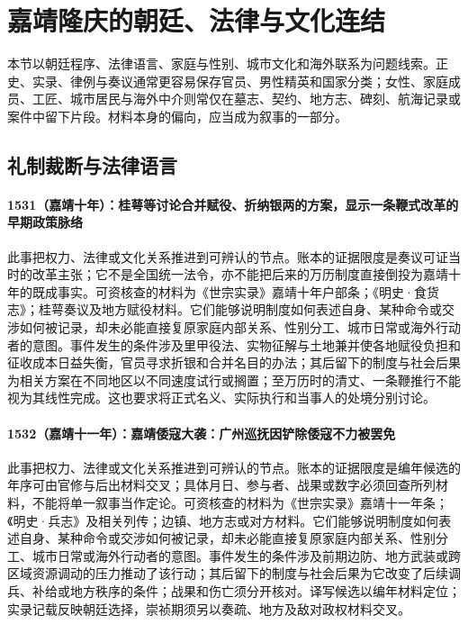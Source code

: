 \section{嘉靖隆庆的朝廷、法律与文化连结}

本节以朝廷程序、法律语言、家庭与性别、城市文化和海外联系为问题线索。正史、实录、律例与奏议通常更容易保存官员、男性精英和国家分类；女性、家庭成员、工匠、城市居民与海外中介则常仅在墓志、契约、地方志、碑刻、航海记录或案件中留下片段。材料本身的偏向，应当成为叙事的一部分。

\subsection{礼制裁断与法律语言}

\paragraph{1531（嘉靖十年）：桂萼等讨论合并赋役、折纳银两的方案，显示一条鞭式改革的早期政策脉络} 此事把权力、法律或文化关系推进到可辨认的节点。账本的证据限度是奏议可证当时的改革主张；它不是全国统一法令，亦不能把后来的万历制度直接倒投为嘉靖十年的既成事实。可资核查的材料为《世宗实录》嘉靖十年户部条；《明史·食货志》；桂萼奏议及地方赋役材料。它们能够说明制度如何表述自身、某种命令或交涉如何被记录，却未必能直接复原家庭内部关系、性别分工、城市日常或海外行动者的意图。事件发生的条件涉及里甲役法、实物征解与土地兼并使各地赋役负担和征收成本日益失衡，官员寻求折银和合并名目的办法；其后留下的制度与社会后果为相关方案在不同地区以不同速度试行或搁置；至万历时的清丈、一条鞭推行不能视为其线性完成。这也要求将正式名义、实际执行和当事人的处境分别讨论。

\paragraph{1532（嘉靖十一年）：嘉靖倭寇大袭：广州巡抚因铲除倭寇不力被罢免} 此事把权力、法律或文化关系推进到可辨认的节点。账本的证据限度是编年候选的年序可由官修与后出材料交叉；具体月日、参与者、战果或数字必须回查所列材料，不能将单一叙事当作定论。可资核查的材料为《世宗实录》嘉靖十一年条；《明史·兵志》及相关列传；边镇、地方志或对方材料。它们能够说明制度如何表述自身、某种命令或交涉如何被记录，却未必能直接复原家庭内部关系、性别分工、城市日常或海外行动者的意图。事件发生的条件涉及前期边防、地方武装或跨区域资源调动的压力推动了该行动；其后留下的制度与社会后果为它改变了后续调兵、补给或地方秩序的条件；战果和伤亡须分开核对。译写候选以编年材料定位；实录记载反映朝廷选择，崇祯期须另以奏疏、地方及敌对政权材料交叉。

